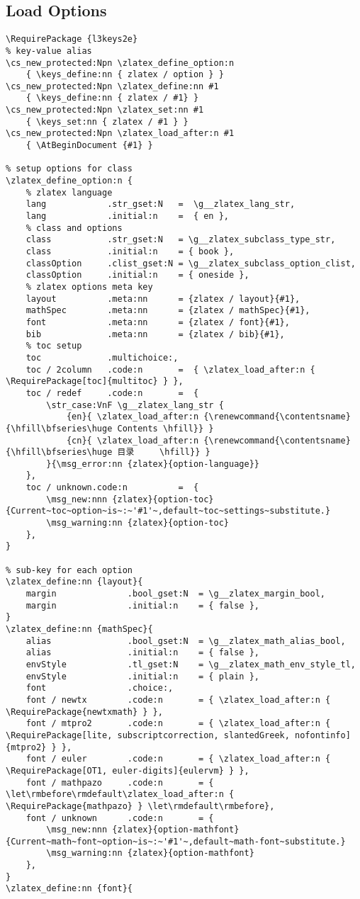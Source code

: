 \subsection{Load Options}
\begin{verbatim}
\RequirePackage {l3keys2e}
% key-value alias
\cs_new_protected:Npn \zlatex_define_option:n
    { \keys_define:nn { zlatex / option } }
\cs_new_protected:Npn \zlatex_define:nn #1
    { \keys_define:nn { zlatex / #1} }
\cs_new_protected:Npn \zlatex_set:nn #1
    { \keys_set:nn { zlatex / #1 } }
\cs_new_protected:Npn \zlatex_load_after:n #1
    { \AtBeginDocument {#1} }

% setup options for class
\zlatex_define_option:n {
    % zlatex language
    lang            .str_gset:N   =  \g__zlatex_lang_str,
    lang            .initial:n    =  { en },
    % class and options
    class           .str_gset:N   = \g__zlatex_subclass_type_str,
    class           .initial:n    = { book },
    classOption     .clist_gset:N = \g__zlatex_subclass_option_clist,
    classOption     .initial:n    = { oneside },
    % zlatex options meta key 
    layout          .meta:nn      = {zlatex / layout}{#1},
    mathSpec        .meta:nn      = {zlatex / mathSpec}{#1},
    font            .meta:nn      = {zlatex / font}{#1},
    bib             .meta:nn      = {zlatex / bib}{#1},
    % toc setup
    toc             .multichoice:,
    toc / 2column   .code:n       =  { \zlatex_load_after:n { \RequirePackage[toc]{multitoc} } },
    toc / redef     .code:n       =  { 
        \str_case:VnF \g__zlatex_lang_str {
            {en}{ \zlatex_load_after:n {\renewcommand{\contentsname}{\hfill\bfseries\huge Contents \hfill}} }
            {cn}{ \zlatex_load_after:n {\renewcommand{\contentsname}{\hfill\bfseries\huge 目录     \hfill}} }
        }{\msg_error:nn {zlatex}{option-language}}
    },
    toc / unknown.code:n          =  {
        \msg_new:nnn {zlatex}{option-toc}{Current~toc~option~is~:~'#1'~,default~toc~settings~substitute.}
        \msg_warning:nn {zlatex}{option-toc}
    },
}

% sub-key for each option
\zlatex_define:nn {layout}{
    margin              .bool_gset:N  = \g__zlatex_margin_bool,
    margin              .initial:n    = { false },
}
\zlatex_define:nn {mathSpec}{
    alias               .bool_gset:N  = \g__zlatex_math_alias_bool,
    alias               .initial:n    = { false },
    envStyle            .tl_gset:N    = \g__zlatex_math_env_style_tl,
    envStyle            .initial:n    = { plain },
    font                .choice:,
    font / newtx        .code:n       = { \zlatex_load_after:n { \RequirePackage{newtxmath} } },
    font / mtpro2       .code:n       = { \zlatex_load_after:n { \RequirePackage[lite, subscriptcorrection, slantedGreek, nofontinfo]{mtpro2} } },
    font / euler        .code:n       = { \zlatex_load_after:n { \RequirePackage[OT1, euler-digits]{eulervm} } },
    font / mathpazo     .code:n       = { \let\rmbefore\rmdefault\zlatex_load_after:n { \RequirePackage{mathpazo} } \let\rmdefault\rmbefore},
    font / unknown      .code:n       = {
        \msg_new:nnn {zlatex}{option-mathfont}{Current~math~font~option~is~:~'#1'~,default~math-font~substitute.}
        \msg_warning:nn {zlatex}{option-mathfont}
    },
}
\zlatex_define:nn {font}{


\end{verbatim}
